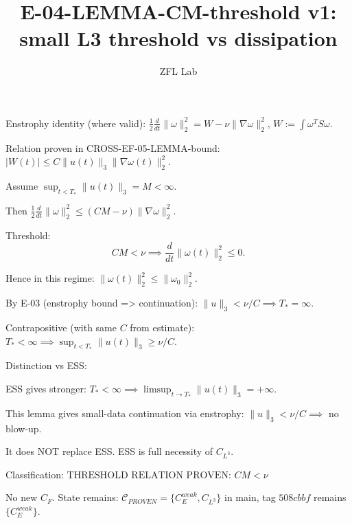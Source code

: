 \documentclass[11pt]{article}
\title{E-04-LEMMA-CM-threshold v1: small L3 threshold vs dissipation}
\author{ZFL Lab}
\begin{document}
\maketitle

Enstrophy identity (where valid):
$\frac12 \frac{d}{dt}\|\omega\|_2^2 = W - \nu\|\nabla\omega\|_2^2$,
$W:=\int \omega^T S \omega$.

Relation proven in CROSS-EF-05-LEMMA-bound:
$|W(t)| \le C \|u(t)\|_3 \|\nabla\omega(t)\|_2^2$.

Assume
$\sup_{t<T_*}\|u(t)\|_3 = M < \infty$.

Then
$\frac12 \frac{d}{dt}\|\omega\|_2^2 \le (CM - \nu)\|\nabla\omega\|_2^2$.

Threshold:
\begin{equation*}
\boxed{CM < \nu \implies \frac{d}{dt}\|\omega(t)\|_2^2 \le 0.}
\end{equation*}

Hence in this regime:
$\|\omega(t)\|_2^2 \le \|\omega_0\|_2^2$.

By E-03 (enstrophy bound => continuation):
$\boxed{\|u\|_3 < \nu/C \implies T_*=\infty.}$

Contrapositive (with same $C$ from estimate):
$\boxed{T_*<\infty \implies \sup_{t<T_*}\|u(t)\|_3 \ge \nu/C.}$

Distinction vs ESS:

ESS gives stronger:
$T_*<\infty \implies \limsup_{t\to T_*}\|u(t)\|_3 = +\infty$.

This lemma gives small-data continuation via enstrophy:
$\|u\|_3 < \nu/C \implies$ no blow-up.

It does NOT replace ESS. ESS is full necessity of $C_{L^3}$.

Classification:
$\boxed{\text{THRESHOLD RELATION PROVEN: } CM<\nu}$

No new $C_F$. State remains:
$\mathcal{C}_{PROVEN}=\{C_E^{weak}, C_{L^3}\}$ in main,
tag $508cbbf$ remains $\{C_E^{weak}\}$.
\end{document}
